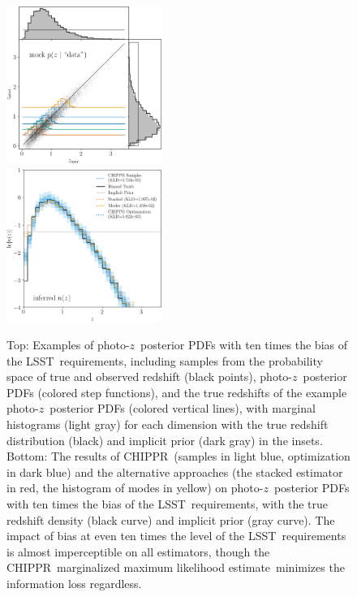 \documentclass[iop]{emulateapj}
\newcommand{\todo}[3]{{\color{#2}\emph{#1}: #3}}
\newcommand{\aim}[1]{\todo{AIM}{red}{#1}}
\newcommand{\project}[1]{\textsc{#1}}
\newcommand{\lsst}{\project{LSST}}
\newcommand{\Chippr}{\project{CHIPPR}}%
\newcommand{\pz}{photo-$z$}
\newcommand{\pzpdf}{\pz\ posterior PDF}%
\newcommand{\mmle}{marginalized maximum likelihood estimate}%
\begin{document}
\begin{figure}
	\begin{center}
	\includegraphics[width=0.45\textwidth]{figures/chippr/thesis_neghivarbias-mega_scatter.png}\\
	\includegraphics[width=0.45\textwidth]{figures/chippr/thesis_neghivarbias_log_estimators.png}
	\caption{
		Top: Examples of \pzpdf s with ten times the bias of the \lsst\ requirements, including samples from the probability space of true and observed redshift (black points), \pzpdf s (colored step functions), and the true redshifts of the example \pzpdf s (colored vertical lines), with marginal histograms (light gray) for each dimension with the true redshift distribution (black) and implicit prior (dark gray) in the insets.
		Bottom: The results of \Chippr\ (samples in light blue, optimization in dark blue) and the alternative approaches (the stacked estimator in red, the histogram of modes in yellow) on \pzpdf s with ten times the bias of the \lsst\ requirements, with the true redshift density (black curve) and implicit prior (gray curve).
		The impact of bias at even ten times the level of the \lsst\ requirements is almost imperceptible on all estimators, though the \Chippr\ \mmle\ minimizes the information loss regardless.
	}
	\label{fig:bias}
	\end{center}
\end{figure}
\end{document}
